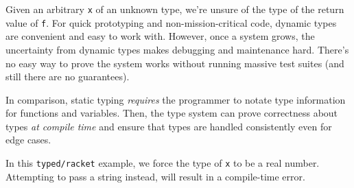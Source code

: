 \documentclass{book}
\newcommand{\Scribtexttt}[1]{{\texttt{#1}}}
\begin{document}
Given an arbitrary \Scribtexttt{x} of an unknown type, we{'}re unsure of the type of
the return value of \Scribtexttt{f}. For quick prototyping and non{-}mission{-}critical
code, dynamic types are convenient and easy to work with. However, once
a system grows, the uncertainty from dynamic types makes debugging and
maintenance hard. There{'}s no easy way to prove the system works without
running massive test suites (and still there are no guarantees).

In comparison, static typing \textit{requires} the programmer to notate type
information for functions and variables. Then, the type system can prove
correctness about types \textit{at compile time} and ensure that types are
handled consistently even for edge cases.

In this \Scribtexttt{typed/racket} example, we force the type of \Scribtexttt{x} to be
a real number. Attempting to pass a string instead, will result in
a compile{-}time error.
\end{document}
